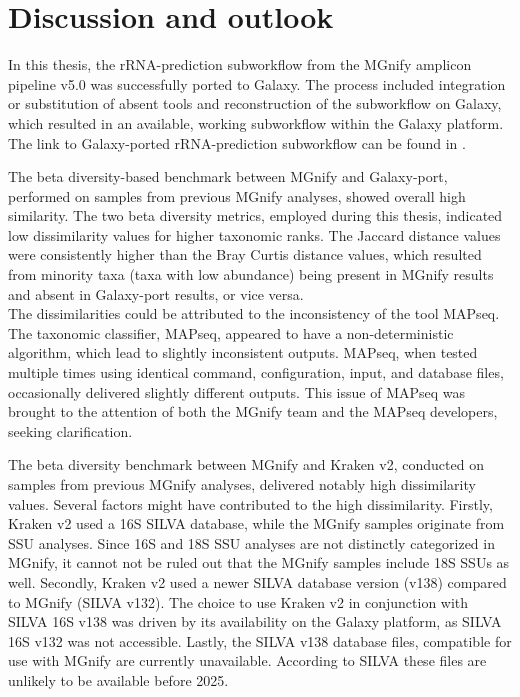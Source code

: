 \chapter{Discussion and outlook}\label{chap:Discussion}
In this thesis, the rRNA-prediction subworkflow from the MGnify amplicon pipeline v5.0 was successfully ported to Galaxy. The process included integration or substitution of absent tools and reconstruction of the subworkflow on Galaxy, which resulted in an available, working subworkflow within the Galaxy platform. The link to Galaxy-ported rRNA-prediction subworkflow can be found in .\par
The beta diversity-based benchmark between MGnify and Galaxy-port, performed on samples from previous MGnify analyses, showed overall high similarity. The two beta diversity metrics, employed during this thesis, indicated low dissimilarity values for higher taxonomic ranks. The Jaccard distance values were consistently higher than the Bray Curtis distance values, which resulted from minority taxa (taxa with low abundance) being present in MGnify results and absent in Galaxy-port results, or vice versa.\\
The dissimilarities could be attributed to the inconsistency of the tool MAPseq. The taxonomic classifier, MAPseq, appeared to have a non-deterministic algorithm, which lead to slightly inconsistent outputs. MAPseq, when tested multiple times using identical command, configuration, input, and database files, occasionally delivered slightly different outputs. This issue of MAPseq was brought to the attention of both the MGnify team and the MAPseq developers, seeking clarification.\par
The beta diversity benchmark between MGnify and Kraken v2, conducted on samples from previous MGnify analyses, delivered notably high dissimilarity values. Several factors might have contributed to the high dissimilarity. Firstly, Kraken v2 used a 16S SILVA database, while the MGnify samples originate from SSU analyses. Since 16S and 18S SSU analyses are not distinctly categorized in MGnify, it cannot not be ruled out that the MGnify samples include 18S SSUs as well. Secondly, Kraken v2 used a newer SILVA database version (v138) compared to MGnify (SILVA v132). The choice to use Kraken v2 in conjunction with SILVA 16S v138 was driven by its availability on the Galaxy platform, as SILVA 16S v132 was not accessible. Lastly, the SILVA v138 database files, compatible for use with MGnify are currently unavailable. According to SILVA these files are unlikely to be available before 2025.\par
